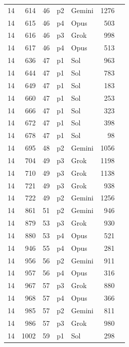 \begin{longtable}{r r r l l r L{2.3in}}
14 & 614 & 46 & p2 & Gemini & 1276 &  \\
14 & 615 & 46 & p4 & Opus & 503 &  \\
14 & 616 & 46 & p3 & Grok & 998 &  \\
14 & 617 & 46 & p4 & Opus & 513 &  \\
14 & 636 & 47 & p1 & Sol & 963 &  \\
14 & 644 & 47 & p1 & Sol & 783 &  \\
14 & 649 & 47 & p1 & Sol & 183 &  \\
14 & 660 & 47 & p1 & Sol & 253 &  \\
14 & 666 & 47 & p1 & Sol & 323 &  \\
14 & 672 & 47 & p1 & Sol & 398 &  \\
14 & 678 & 47 & p1 & Sol & 98 &  \\
14 & 695 & 48 & p2 & Gemini & 1056 &  \\
14 & 704 & 49 & p3 & Grok & 1198 &  \\
14 & 710 & 49 & p3 & Grok & 1138 &  \\
14 & 721 & 49 & p3 & Grok & 938 &  \\
14 & 722 & 49 & p2 & Gemini & 1256 &  \\
14 & 861 & 51 & p2 & Gemini & 946 &  \\
14 & 879 & 53 & p3 & Grok & 930 &  \\
14 & 880 & 53 & p4 & Opus & 521 &  \\
14 & 946 & 55 & p4 & Opus & 281 &  \\
14 & 956 & 56 & p2 & Gemini & 911 &  \\
14 & 957 & 56 & p4 & Opus & 316 &  \\
14 & 967 & 57 & p3 & Grok & 880 &  \\
14 & 968 & 57 & p4 & Opus & 366 &  \\
14 & 985 & 57 & p2 & Gemini & 811 &  \\
14 & 986 & 57 & p3 & Grok & 980 &  \\
14 & 1002 & 59 & p1 & Sol & 298 &  \\

\end{longtable}
